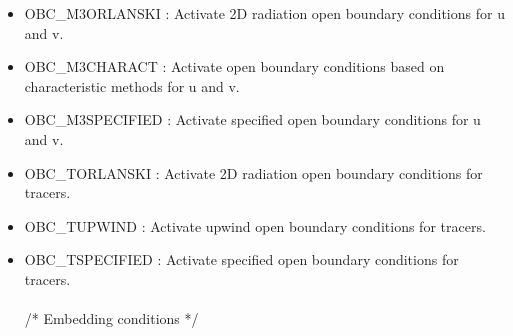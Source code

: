 \begin{itemize}
\item OBC\_M3ORLANSKI : Activate 2D radiation open boundary conditions for u and v.
\item OBC\_M3CHARACT : Activate open boundary conditions based on characteristic methods 
for u and v.
\item OBC\_M3SPECIFIED : Activate specified open boundary conditions for u and v.
\item OBC\_TORLANSKI :  Activate 2D radiation open boundary conditions for tracers.
\item OBC\_TUPWIND : Activate upwind open boundary conditions for tracers.
\item OBC\_TSPECIFIED : Activate specified open boundary conditions for tracers.
\\ \\ /*                       Embedding conditions */


\end{itemize}
